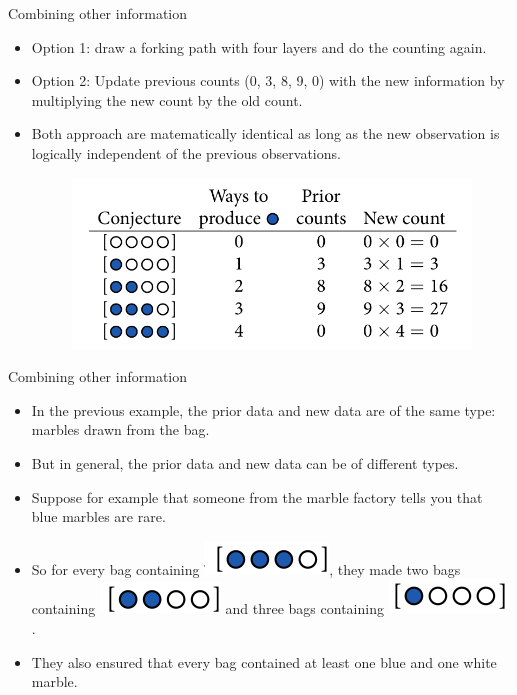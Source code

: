 \documentclass[handout]{beamer}
\begin{document}
\begin{frame}{Combining other information}
\scriptsize{
\begin{itemize}
 \item Option 1: draw a forking path with four layers and do the counting again.
\item Option 2: Update previous counts (0, 3, 8, 9, 0) with the new information by multiplying the new count by the old count.
\item Both approach are matematically identical as long
as the new observation is logically independent of the previous observations. 

\begin{figure}[h!]
	\centering
	\includegraphics[scale=0.33]{pics/marbles16.png}
\end{figure}
\end{itemize}
 } 
\end{frame}



\begin{frame}{Combining other information}
\scriptsize{
\begin{itemize}
 \item In the previous example, the prior data and new data are of the same type: marbles drawn from the bag. 
 \item But in general, the prior data and new data can be of different types. 
 \item Suppose for example that someone from the marble factory tells you that blue marbles are rare.
 \item So for every bag containing \includegraphics[scale=0.3]{pics/marbles14.png}, they made two bags containing \includegraphics[scale=0.3]{pics/marbles13.png} and three bags containing \includegraphics[scale=0.3]{pics/marbles17.png} . 
 \item They also ensured that every bag contained at least one blue and one white marble. 
\end{itemize}
 } 
\end{frame}
\end{document}
